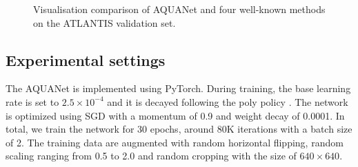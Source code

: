 \documentclass{article}
\begin{document}
\begin{figure*}[h]
\caption{Visualisation comparison of AQUANet and four well-known methods on the ATLANTIS validation set.}
    \label{fig:56test}
\end{figure*}

\subsection{Experimental settings}
\label{exp_setting}

The AQUANet is implemented using PyTorch. 
During training, the base learning rate is set to $2.5 \times 10^{-4}$ and it is decayed following the poly policy \cite{zhao2017pyramid}.
The network is optimized using SGD with a momentum of 0.9 and weight decay of 0.0001.
In total, we train the network for 30 epochs, around 80K iterations with a batch size of 2.
The training data are augmented with random horizontal flipping, random scaling ranging from 0.5 to 2.0 and random cropping with the size of $640 \times 640$.
\end{document}
